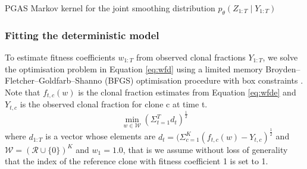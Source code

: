 \documentclass{article}
\begin{document}
\begin{algorithm}
\caption{PGAS Markov kernel for the joint smoothing distribution $p_{\theta}(Z_{1:T} \mid Y_{1:T})$} \label{alg:PGASSSM}
\end{algorithm}


\subsubsection{Fitting the deterministic model}
\label{ssec:fitwfd}
To estimate fitness coefficients $w_{1:T}$ from observed clonal fractions $Y_{1:T}$, we solve the optimisation problem in Equation \ref{eq:wfd} using a limited memory Broyden–Fletcher–Goldfarb–Shanno (BFGS) optimisation procedure with box constraints \cite{nocedal2006numerical}. 
Note that $f_{t,c}(w)$ is the clonal fraction estimates from Equation \ref{eq:wfde} and $Y_{t,c}$ is the observed clonal fraction for clone c at time t.
\begin{equation} \label{eq:wfd}
\min_{w \in \mathcal{W}} (\Sigma_{t=1}^{T} d_t )^{\frac{1}{2}} 
\end{equation}
where $d_{1:T}$ is a vector whose elements are $d_t = (\Sigma_{c=1}^K (f_{t,c}(w) - Y_{t,c})^{\frac{1}{2}}$ and $\mathcal{W} = (\mathcal{R} \cup \{0\})^{K}$ and $w_1 = 1.0$, that is we assume without loss of generality that the index of the reference clone with fitness coefficient 1 is set to 1.
\end{document}
